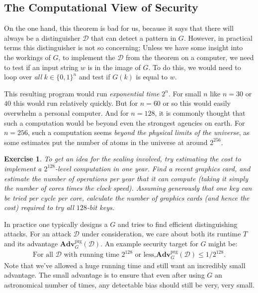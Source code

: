 \documentclass[11pt]{article}
\newtheorem{exercise}{Exercise}
\newcommand{\calD}{\mathcal{D}}
\newcommand{\Adv}{\mathbf{Adv}}
\newcommand{\AdvPRG}[2]{\Adv^{\mathrm{prg}}_{#1}({#2})}
\newcommand{\bits}{\{0,1\}}
\begin{document}
\subsection{The Computational View of Security}

On the one hand, this theorem is bad for us, because it says that there will
always be a distinguisher $\calD$ that can detect a pattern in $G$.  However,
in practical terms this distinguisher is not so concerning; Unless we have some
insight into the workings of $G$, to implement the $\calD$ from the theorem on
a computer, we need to test if an input string $w$ is in the image of $G$. To
do this, we would need to loop over \emph{all} $k\in\bits^n$ and test if $G(k)$
is equal to $w$. 

This resulting program would run \emph{exponential time} $2^n$.  For small $n$
like $n=30$ or $40$ this would run relatively quickly.  But for $n=60$ or so
this would easily overwhelm a personal computer. And for $n=128$, it is
commonly thought that such a computation would be beyond even the strongest
agencies on earth.  For $n=256$, such a computation seems \emph{beyond the
physical limits of the universe}, as some estimates put the number of atoms in
the universe at around $2^{256}$.

\begin{exercise}
    To get an idea for the scaling involved, try estimating the cost to
    implement a $2^{128}$-level computation in one year. Find a 
    recent graphics card, and estimate the number of operations
    per year that it can compute (taking it simply the number of cores
    times the clock speed). Assuming generously that one key can be tried
    per cycle per core, calculate the number of graphics cards (and hence
    the cost) required to try all $128$-bit keys.
\end{exercise}

In practice one typically designs a $G$ and tries to find efficient
distinguishing attacks. For an attack $\calD$ under consideration, we
care about both its runtime $T$ and its advantage $\AdvPRG{G}{\calD}$.
An example security target for $G$ might be:
\begin{align}\label{eq:bound}
    \text{For all $\calD$ with running time $2^{128}$ or less,
$\AdvPRG{G}{\calD}\leq 1/2^{128}$.}
\end{align}
Note that we've allowed a huge running time and still want an incredibly small
advantage. The small advantage is to ensure that even after using $G$ an
astronomical number of times, any detectable bias should still be very, very
small.
\end{document}
